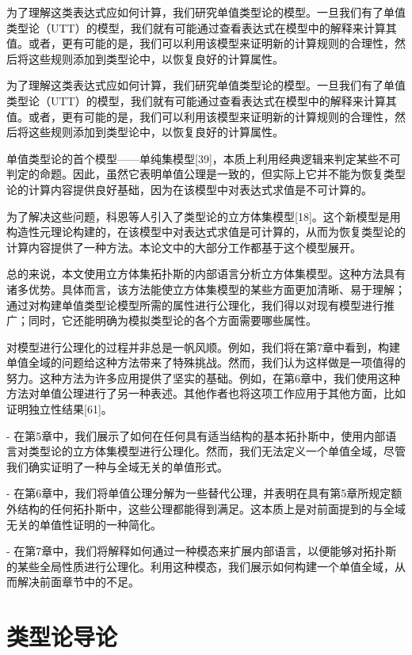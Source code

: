 \documentclass{ctexrep}
\theoremstyle{plain}
\theoremstyle{definition}
\theoremstyle{remark}
\begin{document}
为了理解这类表达式应如何计算，我们研究单值类型论的模型。一旦我们有了单值类型论（UTT）的模型，我们就有可能通过查看表达式在模型中的解释来计算其值。或者，更有可能的是，我们可以利用该模型来证明新的计算规则的合理性，然后将这些规则添加到类型论中，以恢复良好的计算属性。 

为了理解这类表达式应如何计算，我们研究单值类型论的模型。一旦我们有了单值类型论（UTT）的模型，我们就有可能通过查看表达式在模型中的解释来计算其值。或者，更有可能的是，我们可以利用该模型来证明新的计算规则的合理性，然后将这些规则添加到类型论中，以恢复良好的计算属性。 

单值类型论的首个模型——单纯集模型[39]，本质上利用经典逻辑来判定某些不可判定的命题。因此，虽然它表明单值公理是一致的，但实际上它并不能为恢复类型论的计算内容提供良好基础，因为在该模型中对表达式求值是不可计算的。 

为了解决这些问题，科恩等人引入了类型论的立方体集模型[18]。这个新模型是用构造性元理论构建的，在该模型中对表达式求值是可计算的，从而为恢复类型论的计算内容提供了一种方法。本论文中的大部分工作都基于这个模型展开。 

总的来说，本文使用立方体集拓扑斯的内部语言分析立方体集模型。这种方法具有诸多优势。具体而言，该方法能使立方体集模型的某些方面更加清晰、易于理解；通过对构建单值类型论模型所需的属性进行公理化，我们得以对现有模型进行推广；同时，它还能明确为模拟类型论的各个方面需要哪些属性。

对模型进行公理化的过程并非总是一帆风顺。例如，我们将在第7章中看到，构建单值全域的问题给这种方法带来了特殊挑战。然而，我们认为这样做是一项值得的努力。这种方法为许多应用提供了坚实的基础。例如，在第6章中，我们使用这种方法对单值公理进行了另一种表述。其他作者也将这项工作应用于其他方面，比如证明独立性结果[61]。 

- 在第5章中，我们展示了如何在任何具有适当结构的基本拓扑斯中，使用内部语言对类型论的立方体集模型进行公理化。然而，我们无法定义一个单值全域，尽管我们确实证明了一种与全域无关的单值形式。 

- 在第6章中，我们将单值公理分解为一些替代公理，并表明在具有第5章所规定额外结构的任何拓扑斯中，这些公理都能得到满足。这本质上是对前面提到的与全域无关的单值性证明的一种简化。 

- 在第7章中，我们将解释如何通过一种模态来扩展内部语言，以便能够对拓扑斯的某些全局性质进行公理化。利用这种模态，我们展示如何构建一个单值全域，从而解决前面章节中的不足。 

\chapter{类型论导论}
\end{document}

